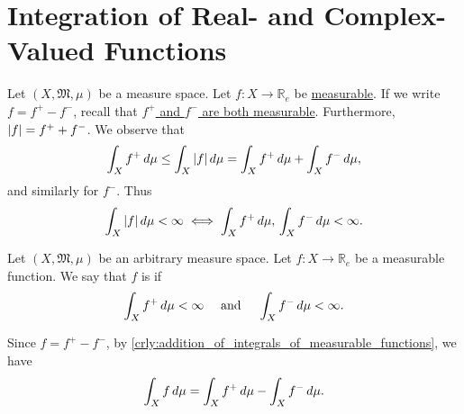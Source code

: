 \documentclass[notoc,notitlepage]{tufte-book}
\begin{document}

\section{Integration of Real- and Complex-Valued Functions}%
\label{sec:integration_of_real_and_complex_valued_functions}

Let $(X, \mathfrak{M}, \mu)$ be a measure space.
Let $f : X \to \mathbb{R}_e$ be \hyperref[defn:measurable_functions]{measurable}.
If we write $f = f^+ - f^-$, recall that
\hyperref[remark:f_plus_and_f_minus_are_measurable]{$f^+$ and $f^-$ are both
measurable}.
Furthermore, $\left|f\right| = f^+ + f^-$.
We observe that
\begin{equation*}
  \int_X f^+ \mathop{}\!d{\mu}
  \leq \int_{X} \left|f\right| \mathop{}\!d{\mu}
  = \int_{X} f^+ \mathop{}\!d{\mu} + \int_{X} f^- \mathop{}\!d{\mu},
\end{equation*}
and similarly for $f^-$.
Thus
\begin{equation*}
  \int_{X} \left|f\right| \mathop{}\!d{\mu} < \infty
  \iff
  \int_{X} f^+ \mathop{}\!d{\mu},\, \int_{X} f^- \mathop{}\!d{\mu} < \infty.
\end{equation*}

\begin{defn}\label{defn:integrable_function}
  Let $(X, \mathfrak{M}, \mu)$ be an arbitrary measure space.
  Let $f : X \to \mathbb{R}_e$ be a measurable function.
  We say that $f$ is  if
  \begin{equation*}
    \int_{X} f^+ \mathop{}\!d{\mu} < \infty \quad\text{ and }\quad
    \int_{X} f^- \mathop{}\!d{\mu} < \infty.
  \end{equation*}
\end{defn}

\begin{remark}
  Since $f = f^+ - f^-$,
  by \cref{crly:addition_of_integrals_of_measurable_functions},
  we have
  \begin{equation*}
    \int_{X} f \mathop{}\!d{\mu} = \int_{X} f^+ \mathop{}\!d{\mu} - \int_{X} f^- \mathop{}\!d{\mu}.
  \end{equation*}
\end{remark}
\end{document}
